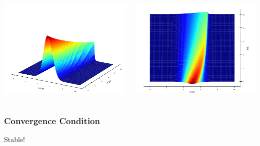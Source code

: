\begin{frame}
  \begin{columns}
    \begin{center}
      \includegraphics[height=.7\textheight]{../BurgersEquation/images/Implicit_front.pdf}
    \end{center}
    \begin{center}
      \includegraphics[height=.7\textheight]{../BurgersEquation/images/Implicit_top.pdf}
    \end{center}
  \end{columns}
\end{frame}

\begin{frame}
  \frametitle{Convergence Condition}
  Stable!
\end{frame}
